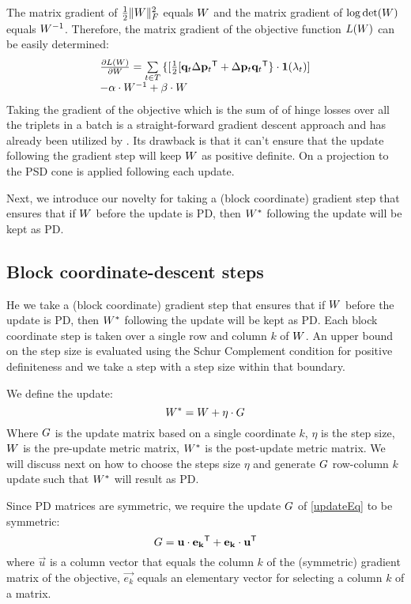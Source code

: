\documentclass{article}
\begin{document}
The matrix gradient of $\tfrac{1}{2} \| {W} \|_{F}^{2}$ equals ${W}$ and the matrix gradient of  $\log \det({W})$ equals ${W}^{-1}$. Therefore, the matrix gradient of the objective function $L({W})$ can be easily determined: 
\begin{equation}
\begin{array}{l}
\frac{\partial {L ({W})}}{\partial {W}} = 
\sum\limits_{t\in T}{\{ [\tfrac{1}{2}[\mathbf{q}_{t}\Delta\mathbf{p}_{t}{}^\mathsf{T} + \Delta\mathbf{p}_{t}\mathbf{q}_{t}{}^\mathsf{T} \} } \cdot \textbf{1}(\lambda_t)] \\ - \alpha \cdot {W}^{-1} + \beta \cdot {W}
\end{array}
\end{equation}
Taking the gradient of the objective which is the sum of of hinge losses over all the triplets in a batch is a straight-forward gradient descent approach and has already been utilized by \cite{qian}. Its drawback is that it can't ensure that the update following the gradient step will keep ${W}$ as positive definite. On \cite{qian} a projection to the PSD cone is applied following each update. 

Next, we introduce our novelty for taking a (block coordinate) gradient step that ensures that if ${W}$ before the update is PD, then ${{W^*}}$ following the update will be kept as PD. 

\subsection{Block coordinate-descent steps}
He we take a (block coordinate) gradient step that ensures that if ${W}$ before the update is PD, then ${{W^*}}$ following the update will be kept as PD. Each block coordinate step is taken over a single row and column $k$ of ${W}$. An upper bound on the step size is evaluated using the Schur Complement condition for positive definiteness and we take a step with a step size within that boundary. 

We define the update:
\begin{equation}
   {{W^*}} = {W} +\eta\cdot{G}
   \label{updateEq}
\end{equation}
Where ${G}$ is the update matrix based on a single coordinate $k$, $\eta$ is the step size, ${W}$ is the pre-update metric matrix, ${{W^*}}$ is the post-update metric matrix. We will discuss next on how to choose the steps size $\eta$ and generate ${G}$ row-column $k$ update such that ${{W^*}}$ will result as PD. 


Since PD matrices are symmetric, we require the update ${G}$ of \eqref{updateEq} to be symmetric:
\begin{equation}
{G} = \mathbf{u}\cdot\mathbf{e_k}{}^\mathsf{T} + \mathbf{e_k}\cdot\mathbf{u}{}^\mathsf{T}
\label{gradMtx}
\end{equation}
where  $\vec{u}$ is a column vector that equals the column $k$ of the (symmetric) gradient matrix of the objective, $\vec{e_k}$ equals an elementary vector for selecting a column $k$ of a matrix. 
\end{document}
